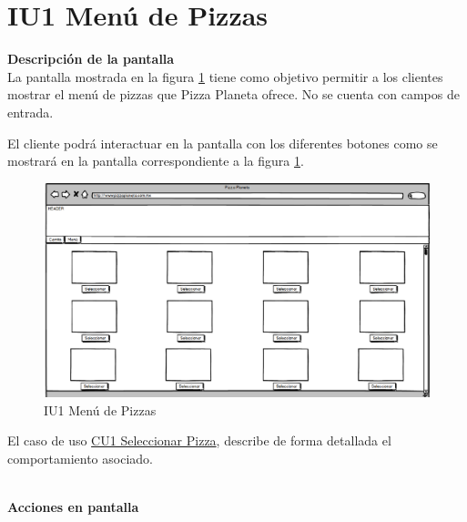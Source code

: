 
\pagebreak
\hypertarget{IU1}{}
\section{IU1 Menú de Pizzas}

	\noindent \textbf{Descripción de la pantalla}\\

		La pantalla mostrada en la figura \ref{IU1} tiene como objetivo permitir a los clientes mostrar el menú de pizzas que Pizza Planeta ofrece. 
		No se cuenta con campos de entrada. 
		
		El cliente podrá interactuar en la pantalla con los diferentes botones como se mostrará en la pantalla correspondiente a la figura \ref{IU1}.
		\begin{figure}[h]

			\begin{center}				

				\includegraphics[scale=0.50]{./imagenes/IUs/RegistroSolicitantes/iu1-IniciarSesion/IU1-MenuDePizzas.png}
				\caption{IU1 Menú de Pizzas}
				\label{IU1}

			\end{center}
				
		\end{figure}


		El caso de uso \hyperlink{CU1}{CU1 Seleccionar Pizza}, describe de forma detallada el comportamiento asociado.

	\noindent \textbf{\\Acciones en pantalla}

